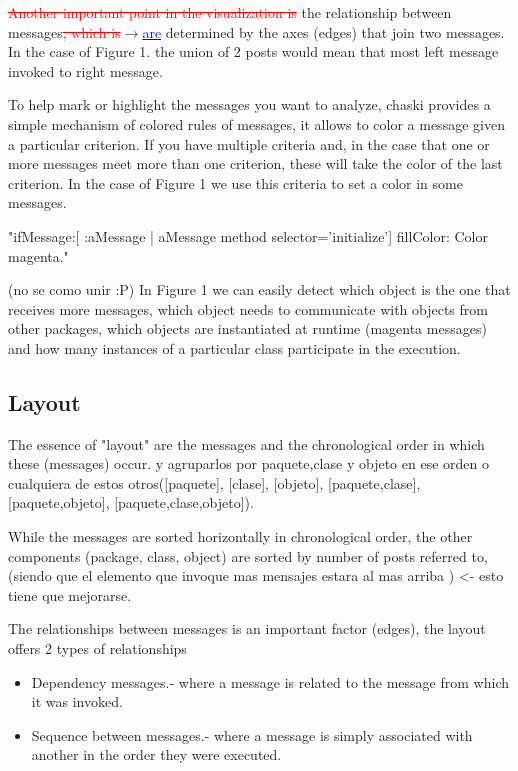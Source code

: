 \documentclass{sig-alternate}
\newcommand{\ra}{$\rightarrow$}
\newcommand{\del}[1]{\textcolor{red}{\sout{#1}}} %
\newcommand{\chg}[2]{\textcolor{red}{\sout{#1}}{\ra}\textcolor{blue}{\uline{#2}}} %
\begin{document}
\del{Another important point in the visualization is} the relationship between messages\chg{, which is}{are} determined by the axes (edges) that join two messages. In the case of Figure 1. the union of 2 posts would mean that most left message invoked to right message.

To help mark or highlight the messages you want to analyze, chaski provides a simple mechanism of colored rules of messages, it allows to color a message given a particular criterion. If you have multiple criteria and, in the case that one or more messages meet more than one criterion, these will take the color of the last criterion. In the case of Figure 1 we use this criteria to set a color in some messages.

    "ifMessage:[  :aMessage  | aMessage method selector='initialize'] fillColor: Color magenta."

(no se como unir :P)
In Figure 1 we can easily detect which object is the one that receives more messages, which object needs to communicate with objects from other packages, which objects are instantiated at runtime (magenta messages) and how many instances of a particular class participate in the execution.

\subsection{Layout}

The essence of "layout" are the messages and the chronological order in which these (messages) occur. y agruparlos por paquete,clase y objeto en ese orden o cualquiera de estos otros([paquete], [clase], [objeto], [paquete,clase], [paquete,objeto], [paquete,clase,objeto]).

While the messages are sorted horizontally in chronological order, the other components (package, class, object) are sorted by number of posts referred to, (siendo que el elemento que invoque mas mensajes estara al mas arriba ) <- esto tiene que mejorarse.

The relationships between messages is an important factor (edges), the layout offers 2 types of relationships
\begin{itemize}
\item Dependency messages.- where a message is related to the message from which it was invoked.
\item Sequence between messages.- where a message is simply associated with another in the order they were executed.
\end{itemize}
\end{document}
